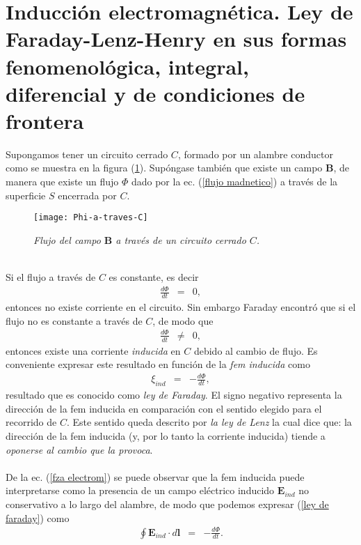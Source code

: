 \documentclass[11pt,fleqn]{book} %
\begin{document}
\section{Inducci\'on electromagn\'etica. Ley de Faraday-Lenz-Henry en sus formas fenomenol\'ogica, integral, diferencial y de condiciones de frontera}
Supongamos tener un circuito cerrado $C$, formado por un alambre conductor como se muestra en la figura (\ref{Phi-a-traves-C}). Sup\'ongase tambi\'en que existe un campo $\textbf{B}$, de manera que existe un flujo $\Phi$ dado por la ec. (\ref{flujo madnetico}) a trav\'es de la superficie $S$ encerrada por $C$.\\
\begin{figure}[h]
  \centering
    \texttt{[image: Phi-a-traves-C]}
        \caption{\emph{Flujo del campo $\textbf{B}$ a trav\'es de un circuito cerrado $C$.}}\label{Phi-a-traves-C}
\end{figure}\\
Si el flujo a trav\'es de $C$ es constante, es decir
\begin{eqnarray}
\frac{d\Phi}{dt}&=&0,
\end{eqnarray}
entonces no existe corriente en el circuito. Sin embargo Faraday encontr\'o que si el flujo no es constante a trav\'es de $C$, de modo que
\begin{eqnarray}
\frac{d\Phi}{dt}&\neq &0,
\end{eqnarray}
entonces existe una corriente \emph{inducida} en $C$ debido al cambio de flujo. Es conveniente expresar este resultado en funci\'on de la \emph{fem inducida} como
\begin{eqnarray}
\xi_{ind}&=&-\frac{d\Phi}{dt},\label{ley de faraday}
\end{eqnarray}
resultado que es conocido como \emph{ley de Faraday}. El signo negativo representa la direcci\'on de la fem inducida en comparaci\'on con el sentido elegido para el recorrido de $C$. Este sentido queda descrito por \emph{la ley de Lenz} la cual dice que: la direcci\'on de la fem inducida (y, por lo tanto la corriente inducida) tiende a \emph{oponerse al cambio que la provoca}.\\
\\
De la ec. (\ref{fza electrom}) se puede observar que la fem inducida puede interpretarse como la presencia de un campo el\'ectrico inducido $\textbf{E}_{ind}$ no conservativo a lo largo del alambre, de modo que podemos expresar (\ref{ley de faraday}) como
\begin{eqnarray}
\oint\textbf{E}_{ind}\cdot d\textbf{l}&=&-\frac{d\Phi}{dt}.\label{E ind}
\end{eqnarray}
\end{document}
